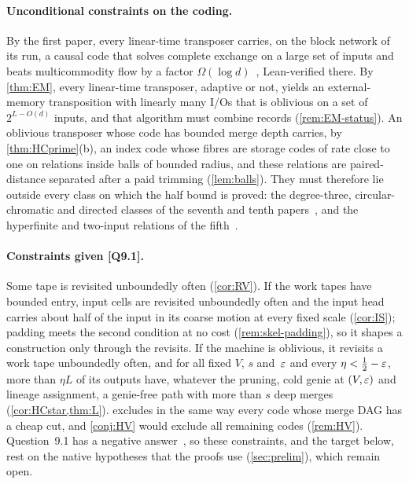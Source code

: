 \paragraph{Unconditional constraints on the coding.} By the first paper, every linear-time transposer carries, on the
block network of its run, a causal code that solves complete exchange on a large set of inputs and beats multicommodity
flow by a factor $\Omega(\log d)$~\cite[Theorems~8.8 and~9.2]{FirstPaper2026}, Lean-verified there. By \cref{thm:EM},
every linear-time transposer, adaptive or not, yields an external-memory transposition with linearly many I/Os that is
oblivious on a set of $2^{L-O(d)}$ inputs, and that algorithm must combine records (\cref{rem:EM-status}). An oblivious
transposer whose code has bounded merge depth carries, by \cref{thm:HCprime}(b), an index code whose fibres are storage
codes of rate close to one on relations inside balls of bounded radius, and these relations are paired-distance
separated after a paid trimming (\cref{lem:balls}). They must therefore lie outside every class on which the half bound
is proved: the degree-three, circular-chromatic and directed classes of the seventh and tenth
papers~\cite{SeventhPaper2026,DirectedReciprocity2026}, and the hyperfinite and two-input relations of the
fifth~\cite[Corollary~4.4 and Theorem~5.1]{DirectedRecovery2026}.

\paragraph{Constraints given [Q9.1].} Some tape is revisited unboundedly often (\cref{cor:RV}). If the work tapes have
bounded entry, input cells are revisited unboundedly often and the input head carries about half of the input in its
coarse motion at every fixed scale (\cref{cor:IS}); padding meets the second condition at no cost
(\cref{rem:skel-padding}), so it shapes a construction only through the revisits. If the machine is oblivious, it
revisits a work tape unboundedly often, and for all fixed $V$, $s$ and~$\varepsilon$ and every $\eta<\frac12-\varepsilon$, more than
$\eta L$ of its outputs have, whatever the pruning, cold genie at $(V,\varepsilon)$ and lineage assignment, a genie-free path
with more than $s$ deep merges (\cref{cor:HCstar,thm:L}).  excludes in the same way every
code whose merge DAG has a cheap cut, and \cref{conj:HV} would exclude all remaining codes (\cref{rem:HV}). Question~9.1
has a negative answer~\cite[Theorem~A]{StorageCodes2026}, so these constraints, and the target below, rest on the native
hypotheses that the proofs use (\cref{sec:prelim}), which remain open.

